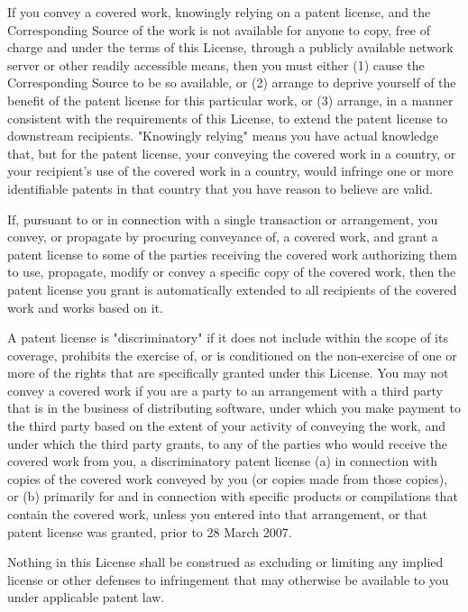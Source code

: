If you convey a covered work, knowingly relying on a patent license,
and the Corresponding Source of the work is not available for anyone
to copy, free of charge and under the terms of this License, through a
publicly available network server or other readily accessible means,
then you must either (1) cause the Corresponding Source to be so
available, or (2) arrange to deprive yourself of the benefit of the
patent license for this particular work, or (3) arrange, in a manner
consistent with the requirements of this License, to extend the patent
license to downstream recipients.  "Knowingly relying" means you have
actual knowledge that, but for the patent license, your conveying the
covered work in a country, or your recipient's use of the covered work
in a country, would infringe one or more identifiable patents in that
country that you have reason to believe are valid.

If, pursuant to or in connection with a single transaction or
arrangement, you convey, or propagate by procuring conveyance of, a
covered work, and grant a patent license to some of the parties
receiving the covered work authorizing them to use, propagate, modify
or convey a specific copy of the covered work, then the patent license
you grant is automatically extended to all recipients of the covered
work and works based on it.

A patent license is "discriminatory" if it does not include within
the scope of its coverage, prohibits the exercise of, or is
conditioned on the non-exercise of one or more of the rights that are
specifically granted under this License.  You may not convey a covered
work if you are a party to an arrangement with a third party that is
in the business of distributing software, under which you make payment
to the third party based on the extent of your activity of conveying
the work, and under which the third party grants, to any of the
parties who would receive the covered work from you, a discriminatory
patent license (a) in connection with copies of the covered work
conveyed by you (or copies made from those copies), or (b) primarily
for and in connection with specific products or compilations that
contain the covered work, unless you entered into that arrangement,
or that patent license was granted, prior to 28 March 2007.

Nothing in this License shall be construed as excluding or limiting
any implied license or other defenses to infringement that may
otherwise be available to you under applicable patent law.

